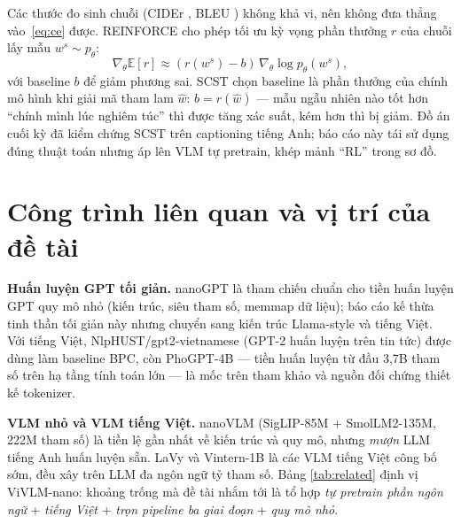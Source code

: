 Các thước đo sinh chuỗi (CIDEr \autocite{vedantam2015cider}, BLEU
\autocite{papineni2002bleu}) không khả vi, nên không đưa thẳng vào~\eqref{eq:ce}
được. REINFORCE \autocite{williams1992reinforce} cho phép tối ưu kỳ vọng phần
thưởng $r$ của chuỗi lấy mẫu $w^s \sim p_\theta$:
\begin{equation}
	\nabla_\theta \mathbb{E}[r] \approx (r(w^s) - b)\,\nabla_\theta \log p_\theta(w^s),
	\label{eq:reinforce}
\end{equation}
với baseline $b$ để giảm phương sai. SCST \autocite{rennie2017scst} chọn
baseline là phần thưởng của chính mô hình khi giải mã tham lam $\hat{w}$:
$b = r(\hat{w})$ --- mẫu ngẫu nhiên nào tốt hơn ``chính mình lúc nghiêm túc''
thì được tăng xác suất, kém hơn thì bị giảm. Đồ án cuối kỳ đã kiểm chứng SCST
trên captioning tiếng Anh; báo cáo này tái sử dụng đúng thuật toán nhưng áp
lên VLM tự pretrain, khép mảnh ``RL'' trong sơ đồ.

\section{Công trình liên quan và vị trí của đề tài}
\label{sec:bg-related}

\textbf{Huấn luyện GPT tối giản.} nanoGPT \autocite{karpathy2022nanogpt} là
tham chiếu chuẩn cho tiền huấn luyện GPT quy mô nhỏ (kiến trúc, siêu tham số,
memmap dữ liệu); báo cáo kế thừa tinh thần tối giản này nhưng chuyển sang
kiến trúc Llama-style và tiếng Việt. Với tiếng Việt,
NlpHUST/gpt2-vietnamese \autocite{nlphust2021gpt2vi} (GPT-2 huấn luyện trên
tin tức) được dùng làm baseline BPC, còn PhoGPT-4B \autocite{nguyen2023phogpt}
--- tiền huấn luyện từ đầu 3,7B tham số trên hạ tầng tính toán lớn --- là mốc trên
tham khảo và nguồn đối chứng thiết kế tokenizer.

\textbf{VLM nhỏ và VLM tiếng Việt.} nanoVLM \autocite{wiedmann2025nanovlm}
(SigLIP-85M + SmolLM2-135M, 222M tham số) là tiền lệ gần nhất về kiến trúc và
quy mô, nhưng \emph{mượn} LLM tiếng Anh huấn luyện sẵn. LaVy
\autocite{tran2024lavy} và Vintern-1B \autocite{doan2024vintern} là các VLM
tiếng Việt công bố sớm, đều xây trên LLM đa ngôn ngữ tỷ tham số. Bảng
\ref{tab:related} định vị ViVLM-nano: khoảng trống mà đề tài nhắm tới là tổ
hợp \emph{tự pretrain phần ngôn ngữ} + \emph{tiếng Việt} + \emph{trọn pipeline
ba giai đoạn} + \emph{quy mô nhỏ}.

